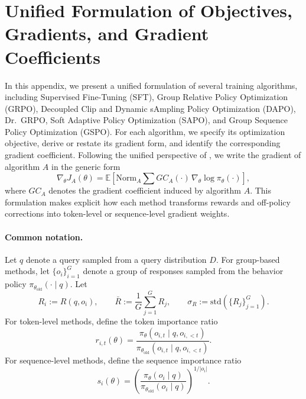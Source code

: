 \documentclass{article}
\begin{document}
\section{Unified Formulation of Objectives, Gradients, and Gradient Coefficients}
\label{app:objective-gradient-coefficient}

In this appendix, we present a unified formulation of several training algorithms, including
Supervised Fine-Tuning (SFT), Group Relative Policy Optimization (GRPO), Decoupled Clip
and Dynamic sAmpling Policy Optimization (DAPO), Dr.\ GRPO, Soft Adaptive Policy
Optimization (SAPO), and Group Sequence Policy Optimization (GSPO). For each algorithm,
we specify its optimization objective, derive or restate its gradient form, and identify the
corresponding gradient coefficient. Following the unified perspective of \citet{shao2024deepseekmath},
we write the gradient of algorithm $A$ in the generic form
\begin{equation}
\nabla_\theta J_A(\theta)
=
\mathbb{E}\!\left[
\mathrm{Norm}_A
\sum
GC_A(\cdot)\,
\nabla_\theta \log \pi_\theta(\cdot)
\right],
\label{eq:unified_gradient_form}
\end{equation}
where $GC_A$ denotes the gradient coefficient induced by algorithm $A$.
This formulation makes explicit how each method transforms rewards and off-policy corrections
into token-level or sequence-level gradient weights.

\paragraph{Common notation.}
Let $q$ denote a query sampled from a query distribution $D$.
For group-based methods, let $\{o_i\}_{i=1}^G$ denote a group of responses sampled from the
behavior policy $\pi_{\theta_{\mathrm{old}}}(\cdot\mid q)$.
Let
\begin{equation}
R_i := R(q,o_i),\qquad
\bar{R} := \frac{1}{G}\sum_{j=1}^G R_j,\qquad
\sigma_R := \mathrm{std}(\{R_j\}_{j=1}^G).
\end{equation}
For token-level methods, define the token importance ratio
\begin{equation}
r_{i,t}(\theta)
=
\frac{\pi_\theta(o_{i,t}\mid q,o_{i,<t})}
{\pi_{\theta_{\mathrm{old}}}(o_{i,t}\mid q,o_{i,<t})}.
\label{eq:token_ratio}
\end{equation}
For sequence-level methods, define the sequence importance ratio
\begin{equation}
s_i(\theta)
=
\left(
\frac{\pi_\theta(o_i\mid q)}
{\pi_{\theta_{\mathrm{old}}}(o_i\mid q)}
\right)^{1/|o_i|}.
\label{eq:sequence_ratio}
\end{equation}
\end{document}
